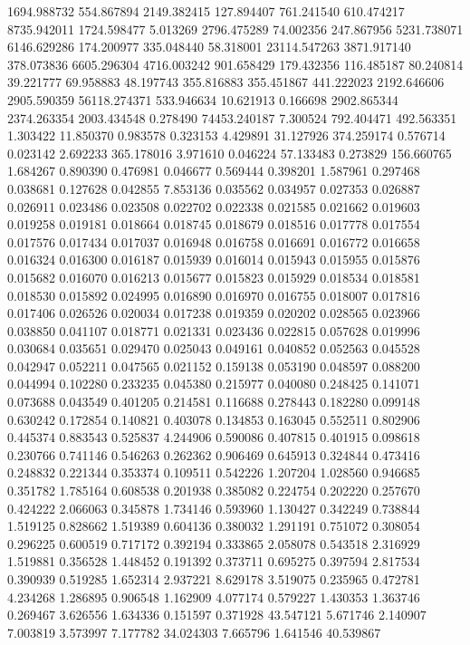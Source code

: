1694.988732
554.867894
2149.382415
127.894407
761.241540
610.474217
8735.942011
1724.598477
5.013269
2796.475289
74.002356
247.867956
5231.738071
6146.629286
174.200977
335.048440
58.318001
23114.547263
3871.917140
378.073836
6605.296304
4716.003242
901.658429
179.432356
116.485187
80.240814
39.221777
69.958883
48.197743
355.816883
355.451867
441.222023
2192.646606
2905.590359
56118.274371
533.946634
10.621913
0.166698
2902.865344
2374.263354
2003.434548
0.278490
74453.240187
7.300524
792.404471
492.563351
1.303422
11.850370
0.983578
0.323153
4.429891
31.127926
374.259174
0.576714
0.023142
2.692233
365.178016
3.971610
0.046224
57.133483
0.273829
156.660765
1.684267
0.890390
0.476981
0.046677
0.569444
0.398201
1.587961
0.297468
0.038681
0.127628
0.042855
7.853136
0.035562
0.034957
0.027353
0.026887
0.026911
0.023486
0.023508
0.022702
0.022338
0.021585
0.021662
0.019603
0.019258
0.019181
0.018664
0.018745
0.018679
0.018516
0.017778
0.017554
0.017576
0.017434
0.017037
0.016948
0.016758
0.016691
0.016772
0.016658
0.016324
0.016300
0.016187
0.015939
0.016014
0.015943
0.015955
0.015876
0.015682
0.016070
0.016213
0.015677
0.015823
0.015929
0.018534
0.018581
0.018530
0.015892
0.024995
0.016890
0.016970
0.016755
0.018007
0.017816
0.017406
0.026526
0.020034
0.017238
0.019359
0.020202
0.028565
0.023966
0.038850
0.041107
0.018771
0.021331
0.023436
0.022815
0.057628
0.019996
0.030684
0.035651
0.029470
0.025043
0.049161
0.040852
0.052563
0.045528
0.042947
0.052211
0.047565
0.021152
0.159138
0.053190
0.048597
0.088200
0.044994
0.102280
0.233235
0.045380
0.215977
0.040080
0.248425
0.141071
0.073688
0.043549
0.401205
0.214581
0.116688
0.278443
0.182280
0.099148
0.630242
0.172854
0.140821
0.403078
0.134853
0.163045
0.552511
0.802906
0.445374
0.883543
0.525837
4.244906
0.590086
0.407815
0.401915
0.098618
0.230766
0.741146
0.546263
0.262362
0.906469
0.645913
0.324844
0.473416
0.248832
0.221344
0.353374
0.109511
0.542226
1.207204
1.028560
0.946685
0.351782
1.785164
0.608538
0.201938
0.385082
0.224754
0.202220
0.257670
0.424222
2.066063
0.345878
1.734146
0.593960
1.130427
0.342249
0.738844
1.519125
0.828662
1.519389
0.604136
0.380032
1.291191
0.751072
0.308054
0.296225
0.600519
0.717172
0.392194
0.333865
2.058078
0.543518
2.316929
1.519881
0.356528
1.448452
0.191392
0.373711
0.695275
0.397594
2.817534
0.390939
0.519285
1.652314
2.937221
8.629178
3.519075
0.235965
0.472781
4.234268
1.286895
0.906548
1.162909
4.077174
0.579227
1.430353
1.363746
0.269467
3.626556
1.634336
0.151597
0.371928
43.547121
5.671746
2.140907
7.003819
3.573997
7.177782
34.024303
7.665796
1.641546
40.539867
